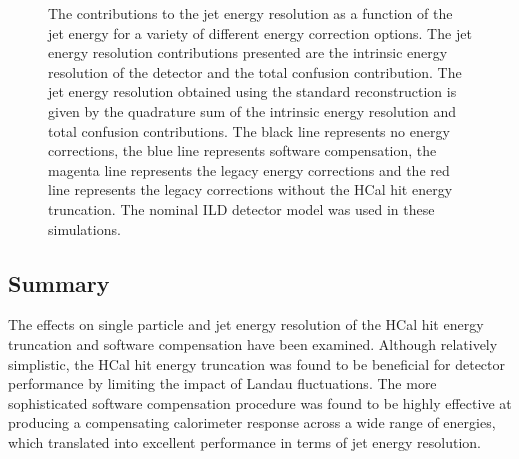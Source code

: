 \begin{figure}[h!]
\caption[The contributions to the jet energy resolution as a function of the jet energy for a variety of different energy correction options.  The jet energy resolution contributions presented are \protect{} the intrinsic energy resolution of the detector and \protect{} the total confusion contribution.  The jet energy resolution obtained using the standard reconstruction is given by the quadrature sum of the intrinsic energy resolution and total confusion contributions.  The black line represents no energy corrections, the blue line represents software compensation, the magenta line represents the legacy energy corrections and the red line represents the legacy corrections without the HCal hit energy truncation.  The nominal ILD detector model was used in these simulations.]{The contributions to the jet energy resolution as a function of the jet energy for a variety of different energy correction options.  The jet energy resolution contributions presented are \protect{} the intrinsic energy resolution of the detector and \protect{} the total confusion contribution.  The jet energy resolution obtained using the standard reconstruction is given by the quadrature sum of the intrinsic energy resolution and total confusion contributions.  The black line represents no energy corrections, the blue line represents software compensation, the magenta line represents the legacy energy corrections and the red line represents the legacy corrections without the HCal hit energy truncation.  The nominal ILD detector model was used in these simulations.}
\label{fig:jerbreakdownsoftcomp}
\end{figure}


\subsection{Summary}
The effects on single particle and jet energy resolution of the HCal hit energy truncation and software compensation have been examined.  Although relatively simplistic, the HCal hit energy truncation was found to be beneficial for detector performance by limiting the impact of Landau fluctuations.  The more sophisticated software compensation procedure was found to be highly effective at producing a compensating calorimeter response across a wide range of energies, which translated into excellent performance in terms of jet energy resolution.

